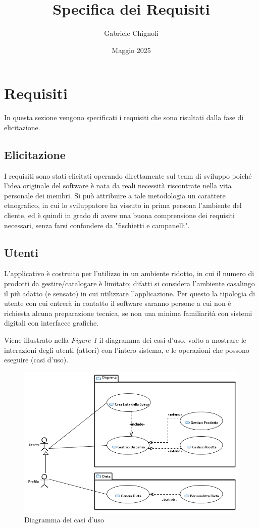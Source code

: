 \documentclass{article}
\title{\huge Specifica dei Requisiti}
\author{Gabriele Chignoli}
\date{Maggio 2025}
\begin{document}
\maketitle
\newpage
\tableofcontents
\newpage

\section{Requisiti}
In questa sezione vengono specificati i requisiti che sono risultati dalla fase di elicitazione. 
\subsection{Elicitazione}
I requisiti sono stati elicitati operando direttamente sul team di sviluppo poiché l'idea originale del software è nata da reali necessità riscontrate nella vita personale dei membri. Si può attribuire a tale metodologia un carattere etnografico, in cui lo sviluppatore ha vissuto in prima persona l'ambiente del cliente, ed è quindi in grado di avere una buona comprensione dei requisiti necessari, senza farsi confondere da "fischietti e campanelli".  

\subsection{Utenti}
L'applicativo è costruito per l'utilizzo in un ambiente ridotto, in cui il numero di prodotti da gestire/catalogare è limitato; difatti si considera l'ambiente casalingo il più adatto (e sensato) in cui utilizzare l'applicazione. Per questo la tipologia di utente con cui entrerà in contatto il software saranno persone a cui non è richiesta alcuna preparazione tecnica, se non una minima familiarità con sistemi digitali con interfacce grafiche. \newline 

Viene illustrato nella \textit{Figure 1} il diagramma dei casi d'uso, volto a mostrare le interazioni degli utenti (attori) con l'intero sistema, e le operazioni che possono eseguire (casi d'uso).

\begin{figure}[H]
    \centering
    \includegraphics[width=\textwidth]{imgs/DiagrammaDeiCasiDUso_0.png}
    \caption{Diagramma dei casi d'uso}
    \label{fig:enter-label}
\end{figure}
\end{document}
